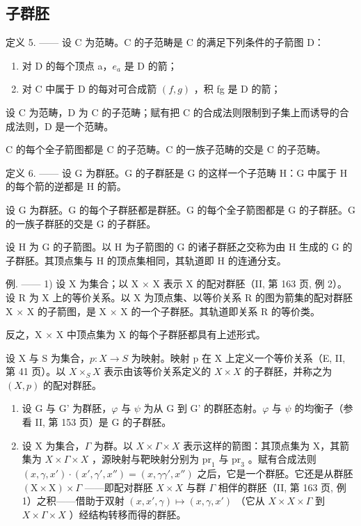 \subsection{子群胚}

定义 5. —— 设 C 为范畴。C 的子范畴是 C 的满足下列条件的子箭图 D：

\begin{enumerate}
\def\labelenumi{(\roman{enumi})}
\item
  对 D 的每个顶点 a，\(e_a\) 是 D 的箭；
\item
  对 C 中属于 D 的每对可合成箭 \((f,g)\) ，积 fg 是 D 的箭；
\end{enumerate}

设 C 为范畴，D 为 C 的子范畴；赋有把 C 的合成法则限制到子集上而诱导的合成法则，D 是一个范畴。

C 的每个全子箭图都是 C 的子范畴。C 的一族子范畴的交是 C 的子范畴。

定义 6. —— 设 G 为群胚。G 的子群胚是 G 的这样一个子范畴 H：G 中属于 H 的每个箭的逆都是 H 的箭。

设 G 为群胚。G 的每个子群胚都是群胚。G 的每个全子箭图都是 G 的子群胚。G 的一族子群胚的交是 G 的子群胚。

设 H 为 G 的子箭图。以 H 为子箭图的 G 的诸子群胚之交称为由 H 生成的 G 的子群胚。其顶点集与 H 的顶点集相同，其轨道即 H 的连通分支。

例. —— 1) 设 X 为集合；以 X × X 表示 X 的配对群胚（II, 第 163 页, 例 2）。设 R 为 X 上的等价关系。以 X 为顶点集、以等价关系 R 的图为箭集的配对群胚 X × X 的子箭图，是 X × X 的一个子群胚。其轨道即关系 R 的等价类。

反之，X × X 中顶点集为 X 的每个子群胚都具有上述形式。

设 X 与 S 为集合，\(p: X \rightarrow S\) 为映射。映射 p 在 X 上定义一个等价关系（E, II, 第 41 页）。以 \(X \times_{S} X\) 表示由该等价关系定义的 \(X \times X\) 的子群胚，并称之为 \((X, p)\) 的配对群胚。

\begin{enumerate}
\def\labelenumi{\arabic{enumi})}
\setcounter{enumi}{1}
\item
  设 G 与 G' 为群胚，\(\varphi\) 与 \(\psi\) 为从 G 到 G' 的群胚态射。\(\varphi\) 与 \(\psi\) 的均衡子（参看 II, 第 153 页）是 G 的子群胚。
\item
  设 X 为集合，\(\Gamma\) 为群。以 \(X \times \Gamma \times X\) 表示这样的箭图：其顶点集为 X，其箭集为 \(X \times \Gamma \times X\) ，源映射与靶映射分别为 \(\mathrm{pr}_1\) 与 \(\mathrm{pr}_3\) 。赋有合成法则 \((x, \gamma, x') \cdot (x', \gamma', x'') = (x, \gamma \gamma', x'')\) 之后，它是一个群胚。它还是从群胚 \((\mathrm{X}\times\mathrm{X})\times\Gamma\) ——即配对群胚 \(X\times X\) 与群 \(\Gamma\) 相伴的群胚（II, 第 163 页, 例 1）之积——借助于双射 \((x,x',\gamma)\mapsto(x,\gamma,x')\) （它从 \(X\times X\times\Gamma\) 到 \(X\times\Gamma\times X\) ）经结构转移而得的群胚。
\end{enumerate}


